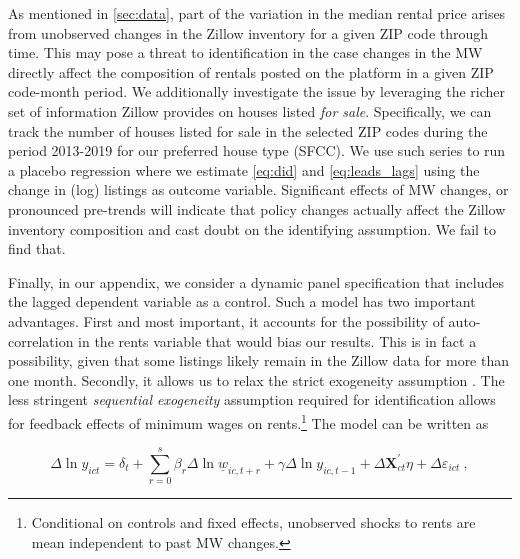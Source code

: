 
As mentioned in \autoref{sec:data}, part of the variation in the median rental price arises 
from unobserved changes in the Zillow inventory for a given ZIP code through time. This may 
pose a threat to identification in the case changes in the MW directly affect the composition 
of rentals posted on the platform in a given ZIP code-month period. We 
additionally investigate the issue by leveraging the richer set of information Zillow provides 
on houses listed \textit{for sale}. Specifically, we can track the number of houses listed for 
sale in the selected ZIP codes during the period 2013-2019 for our preferred house type (SFCC). 
We use such series to run a placebo regression where we estimate \autoref{eq:did} and 
\autoref{eq:leads_lags} using the change in (log) listings as outcome variable. Significant 
effects of MW changes, or pronounced pre-trends will indicate that policy changes actually 
affect the Zillow inventory composition and cast doubt on the identifying assumption. 
We fail to find that.

Finally, in our appendix, we consider a dynamic panel specification that includes the lagged
dependent variable as a control. Such a model has two important advantages. First and most 
important, it accounts for the possibility of auto-correlation in the rents variable that 
would bias our results. This is in fact a possibility, given that some listings likely remain 
in the Zillow data for more than one month. Secondly, it allows us to relax the strict 
exogeneity assumption \parencite{ArellanoHonore2001}. The less stringent \textit{sequential 
exogeneity} assumption required for identification allows for feedback effects of minimum wages 
on rents.\footnote{Conditional on controls and fixed effects, unobserved shocks to rents are mean 
	independent to past MW changes.} The model can be written as

\begin{equation}\label{eq:ab_panel}
	\Delta \ln y_{ict} = \delta_t
						+ \sum_{r=0}^{s} \beta_r \Delta \ln \underline{w}_{ic,t+r}
						+ \gamma \Delta \ln y_{ic,t-1} + \Delta \mathbf{X}^{'}_{ct}\eta
						+ \Delta \varepsilon_{ict} \ ,
\end{equation}

